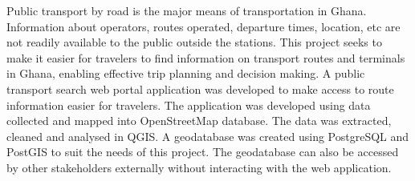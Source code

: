 

\begin{abstracts}        %
Public transport by road is the major means of transportation in Ghana. Information about operators, routes operated, departure times, location, etc are not readily available to the public outside the stations. This project seeks to make it easier for travelers to find information on transport routes and terminals in Ghana, enabling effective trip planning and decision making. A public transport search web portal application was developed to make access to route information easier for travelers. The application was developed using data collected and mapped into OpenStreetMap database. The data was extracted, cleaned and analysed in QGIS.  A geodatabase  was created using PostgreSQL and PostGIS to suit the needs of this project. The geodatabase can also be accessed by other stakeholders externally without interacting with the web application.
\end{abstracts}


